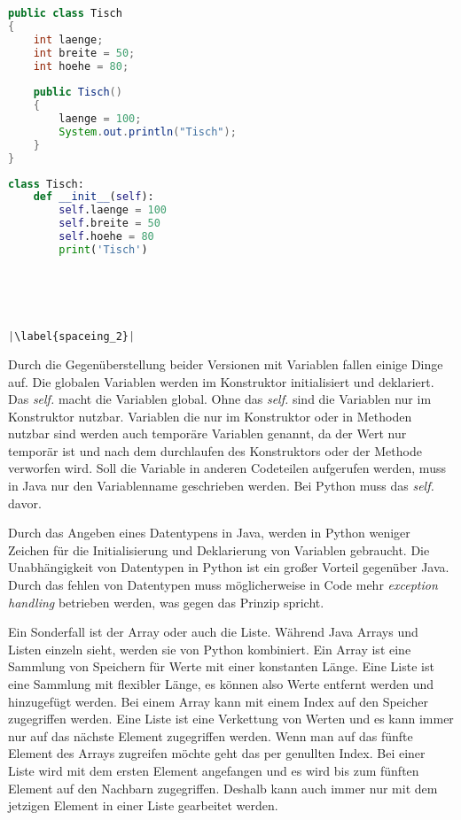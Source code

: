 \begin{minipage}{.5\linewidth}
\begin{lstlisting}[language=java,caption={Variablen in Java},captionpos=b,label={lst:java:variablen},frame=none,escapechar=|]
public class Tisch
{
    int laenge;
    int breite = 50;
    int hoehe = 80;
    
    public Tisch()
    {
        laenge = 100;
        System.out.println("Tisch");
    }
}
\end{lstlisting}
\end{minipage}
\begin{minipage}{.5\linewidth}
\begin{lstlisting}[language=python,caption={Variablen in Python},captionpos=b,label={lst:python:variablen},frame=l,escapechar=|]
class Tisch:
    def __init__(self):
        self.laenge = 100
        self.breite = 50
        self.hoehe = 80
        print('Tisch')





|\label{spaceing_2}|
\end{lstlisting}
\end{minipage}

Durch die Gegenüberstellung beider Versionen mit Variablen fallen einige Dinge auf. Die globalen Variablen werden im Konstruktor initialisiert und deklariert. Das \textit{self.} macht die Variablen global. Ohne das \textit{self.} sind die Variablen nur im Konstruktor nutzbar. Variablen die nur im Konstruktor oder in Methoden nutzbar sind werden auch temporäre Variablen genannt, da der Wert nur temporär ist und nach dem durchlaufen des Konstruktors oder der Methode verworfen wird. Soll die Variable in anderen Codeteilen aufgerufen werden, muss in Java nur den Variablenname geschrieben werden. Bei Python muss das \textit{self.} davor. \par
Durch das Angeben eines Datentypens in Java, werden in Python weniger Zeichen für die Initialisierung und Deklarierung von Variablen gebraucht. Die Unabhängigkeit von Datentypen in Python ist ein großer Vorteil gegenüber Java. Durch das fehlen von Datentypen muss möglicherweise in Code mehr \textit{exception handling} betrieben werden, was gegen das Prinzip spricht.\par
Ein Sonderfall ist der Array oder auch die Liste. Während Java Arrays und Listen einzeln sieht, werden sie von Python kombiniert. Ein Array ist eine Sammlung von Speichern für Werte mit einer konstanten Länge. Eine Liste ist eine Sammlung mit flexibler Länge, es können also Werte entfernt werden und hinzugefügt werden. Bei einem Array kann mit einem Index auf den Speicher zugegriffen werden. Eine Liste ist eine Verkettung von Werten und es kann immer nur auf das nächste Element zugegriffen werden. Wenn man auf das fünfte Element des Arrays zugreifen möchte geht das per genullten Index. Bei einer Liste wird mit dem ersten Element angefangen und es wird bis zum fünften Element auf den Nachbarn zugegriffen. Deshalb kann auch immer nur mit dem jetzigen Element in einer Liste gearbeitet werden. \cite{NRWListe}\cite{Louis:2010}\cite{Python3:Buch}

